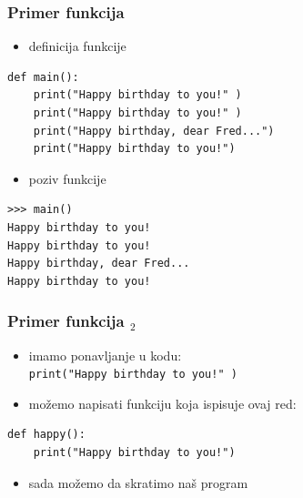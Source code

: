 \documentclass[utf8,compress]{beamer}
\begin{document}

\begin{frame}[fragile]
  \frametitle{Primer funkcija}
  \begin{itemize}
    \item definicija funkcije
  \end{itemize}
\begin{verbatim}
def main():
    print("Happy birthday to you!" )
    print("Happy birthday to you!" )
    print("Happy birthday, dear Fred...")
    print("Happy birthday to you!")
\end{verbatim}
  \begin{itemize}
    \item poziv funkcije
  \end{itemize}
\begin{verbatim}
>>> main()
Happy birthday to you!
Happy birthday to you!
Happy birthday, dear Fred...
Happy birthday to you!
\end{verbatim}
\end{frame}

\begin{frame}[fragile]
  \frametitle{Primer funkcija $_2$}
  \begin{itemize}
    \item imamo ponavljanje u kodu: \\
      \texttt{print("Happy birthday to you!" )}
    \item možemo napisati funkciju koja ispisuje ovaj red:
  \end{itemize}
\begin{verbatim}
def happy():
    print("Happy birthday to you!")
\end{verbatim}
  \begin{itemize}
    \item sada možemo da skratimo naš program
  \end{itemize}
\end{frame}
\end{document}
